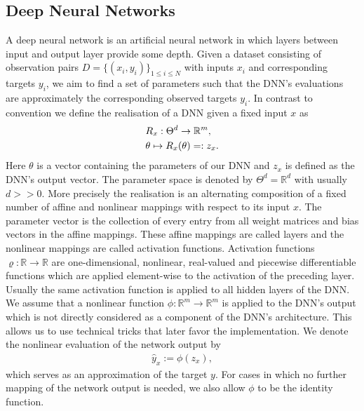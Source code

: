 \documentclass[conference]{IEEEtran}
\begin{document}
	\subsection{Deep Neural Networks}
	\noindent
	A deep neural network is an artificial neural network in which layers between input and output layer provide some depth. Given a dataset consisting of observation pairs $D =\{(x_{i}, y_{i})\}_{1\leq i\leq N}$ with inputs $x_{i}$ and corresponding targets $y_{i}$, we aim to find a set of parameters such that the DNN's evaluations are approximately the corresponding observed targets $y_{i}$. In contrast to convention we define the realisation of a DNN given a fixed input $x$ as
	\begin{align}
	&R_{x}:\Theta^{d}\rightarrow\mathbb{R}^{m}, \notag\\
	&\theta\mapsto R_{x}(\theta) =: z_{x}.
	\end{align}
	Here $\theta$ is a vector containing the parameters of our DNN and $z_{x}$ is defined as the DNN's output vector. The parameter space is denoted by $\Theta^{d} = \mathbb{R}^{d}$ with usually $d>>0$. More precisely the realisation is an alternating composition of a fixed number of affine and nonlinear mappings with respect to its input $x$. The parameter vector is the collection of every entry from all weight matrices and bias vectors in the affine mappings. These affine mappings are called layers and the nonlinear mappings are called activation functions. Activation functions $\varrho:\mathbb{R}\rightarrow\mathbb{R}$ are one-dimensional, nonlinear, real-valued and piecewise differentiable functions which are applied element-wise to the activation of the preceding layer. Usually the same activation function is applied to all hidden layers of the DNN.\\ We assume that a nonlinear function $\phi:\mathbb{R}^{m}\rightarrow\mathbb{R}^{m}$ is applied to the DNN's output which is not directly considered as a component of the DNN's architecture. This allows us to use technical tricks that later favor the implementation. We denote the nonlinear evaluation of the network output by
	\begin{align}
	\hat{y}_{x} := \phi(z_{x}),
	\end{align}
	which serves as an approximation of the target $y$. For cases in which no further mapping of the network output is needed, we also allow $\phi$ to be the identity function.
\end{document}
